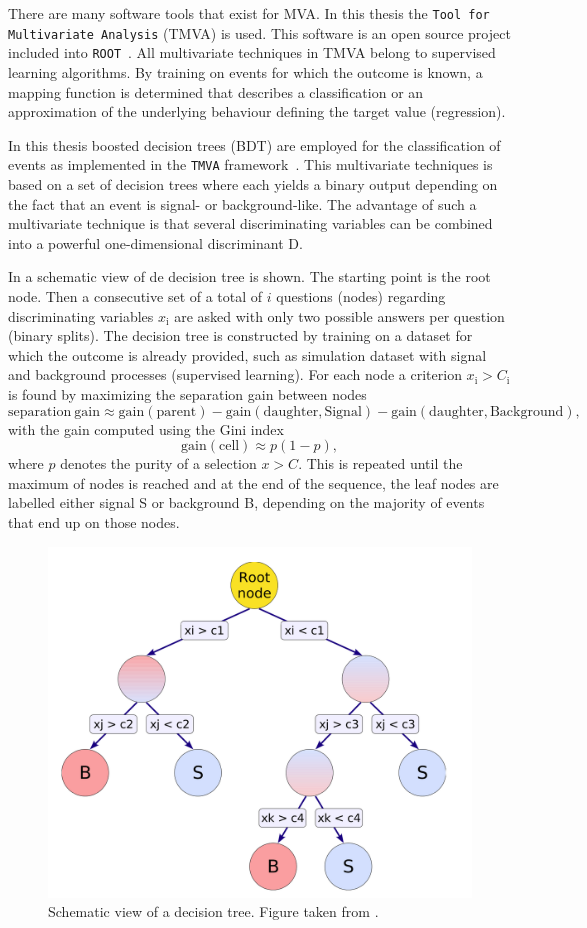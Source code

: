 There are many software tools that exist for MVA. In this thesis the \texttt{Tool for Multivariate Analysis} (TMVA) \cite{2007physics3039H} is used. This software is an open source project included into \texttt{ROOT}~\cite{Brun:1997pa}. 
All multivariate techniques in TMVA belong to supervised learning algorithms. By training on events for which the outcome is known, a mapping function is determined that describes a classification or an approximation of the underlying behaviour defining the target value (regression). 


In this thesis boosted decision trees (BDT) are employed for the classification of events as implemented in the \texttt{TMVA} framework~\cite{2007physics3039H}. This multivariate techniques is based on a set of decision trees where each yields a binary output depending on the fact that an event is signal- or background-like. The advantage of such a multivariate technique is that several discriminating variables can be combined into a powerful one-dimensional discriminant D. 

In  a schematic view of de decision tree is shown. The starting point is the root node. Then a consecutive set of a total of $i$ questions (nodes) regarding discriminating variables $x_\mathrm{i}$ are asked with only two possible answers per question (binary splits). The decision tree is constructed by training on a dataset for which the outcome is already provided, such as simulation dataset with signal and background processes (supervised learning). For each node a criterion $x_{\mathrm{i}}>C_{\mathrm{i}}$ is found by maximizing the separation gain between nodes 
\begin{equation}
\mathrm{separation}\:\mathrm{gain} \approx \mathrm{gain(parent)} - \mathrm{gain (daughter,Signal)} - \mathrm{gain (daughter,Background)},
\end{equation}
with the gain computed using the Gini index
\begin{equation}
 \mathrm{gain(cell)} \approx p (1-p), 
\end{equation}
where $p$ denotes the purity of a selection $x>C$. This is repeated until the maximum of nodes is reached and at the end of the sequence, the leaf nodes are labelled either signal S or background B, depending on the majority of events that end up on those nodes. 
\begin{figure}[htbp]
	\centering
	\includegraphics[width=0.5\linewidth]{3_Analysis_techniques/Figures/BDT}
	\caption{Schematic view of a decision tree. Figure taken from \cite{2007physics3039H}.}
	\label{fig:BDTexample}
\end{figure}

